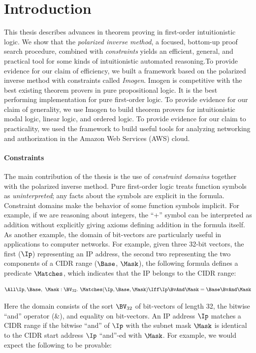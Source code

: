\chapter{Introduction}
\label{chapter-introduction}

This thesis describes advances in theorem proving in first-order intuitionistic
logic.  We show that the \emph{polarized inverse method}, a focused, bottom-up
proof search procedure, combined with \emph{constraints} yields an efficient,
general, and practical tool for some kinds of intuitionistic automated
reasoning.To provide evidence for our claim of efficiency, we built a framework
based on the polarized inverse method with constraints called \emph{Imogen}.
Imogen is competitive with the best existing theorem provers in pure
propositional logic.  It is the best performing implementation for pure
first-order logic.  To provide evidence for our claim of generality, we use
Imogen to build theorem provers for intuitionistic modal logic, linear logic,
and ordered logic.  To provide evidence for our claim to practicality, we used
the framework to build useful tools for analyzing networking and authorization
in the Amazon Web Services (AWS) cloud.

\subsubsection*{Constraints}

The main contribution of the thesis is the use of \emph{constraint domains}
together with the polarized inverse method. Pure first-order logic treats
function symbols as \emph{uninterpreted}; any facts about the symbols are
explicit in the formula.  Constraint domains make the behavior of some function
symbols implicit.  For example, if we are reasoning about integers, the ``+''
symbol can be interpreted as addition without explicitly giving axioms defining
addition in the formula itself.  As another example, the domain of bit-vectors
are particularly useful in applications to computer networks.  For example,
given three 32-bit vectors, the first ($\Ip$) representing an IP address, the
second two representing the two components of a CIDR range ($\Base$, $\Mask$),
the following formula defines a predicate $\Matches$, which indicates that the
IP belongs to the CIDR range:

\[
\All\Ip, \Base,\ \Mask: \BV_{32}.\
  \Matches(\Ip, \Base, \Mask) \Iff \Ip \BvAnd \Mask = \Base\BvAnd\Mask
\]

\noindent
Here the domain consists of the sort $\BV_{32}$ of bit-vectors of length 32,
the bitwise ``and'' operator (\&), and equality on bit-vectors.  An IP address
$\Ip$ matches a CIDR range if the bitwise ``and'' of $\Ip$ with the subnet
mask $\Mask$ is identical to the CIDR start address $\Ip$ ``and''-ed with
$\Mask$.  For example, we would expect the following to be provable:

